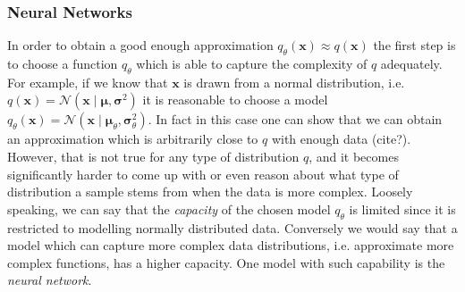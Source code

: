 \documentclass{article}
\begin{document}
\subsubsection{Neural Networks}

In order to obtain a good enough approximation $q_{\theta}(\bm{x}) \approx q(\bm{x})$ the first step is to choose a function $q_{\theta}$ which is able to capture the complexity of $q$ adequately. For example, if we know that $\bm{x}$ is drawn from a normal distribution, i.e. $q(\bm{x}) = \mathcal{N}(\bm{x} \mid \bm{\mu}, \bm{\sigma}^2)$ it is reasonable to choose a model $q_{\theta}(\bm{x}) = \mathcal{N}(\bm{x} \mid \bm{\mu}_{\theta}, \bm{\sigma}_{\theta}^2)$. In fact in this case one can show that we can obtain an approximation which is arbitrarily close to $q$ with enough data (cite?). However, that is not true for any type of distribution $q$, and it becomes significantly harder to come up with or even reason about what type of distribution a sample stems from when the data is more complex. Loosely speaking, we can say that the \textit{capacity} of the chosen model $q_{\theta}$ is limited since it is restricted to modelling normally distributed data. Conversely we would say that a model which can capture more complex data distributions, i.e. approximate more complex functions, has a higher capacity. One model with such capability is the \textit{neural network}.
\end{document}
